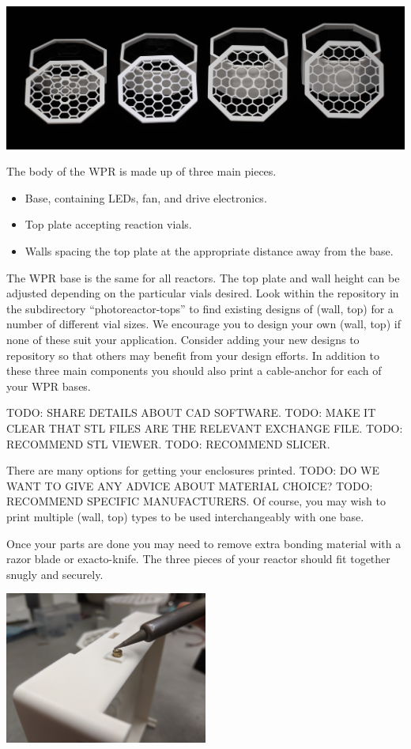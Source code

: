 \documentclass[11pt]{article}
\begin{document}
\includegraphics[width=\textwidth]{"./3dp-coverat.jpg"}

The body of the WPR is made up of three main pieces.

\begin{itemize}
    \item Base, containing LEDs, fan, and drive electronics.
    \item Top plate accepting reaction vials.
    \item Walls spacing the top plate at the appropriate distance away from the base.
\end{itemize}

The WPR base is the same for all reactors.
The top plate and wall height can be adjusted depending on the particular vials desired.
Look within the repository in the subdirectory ``photoreactor-tops'' to find existing designs of (wall, top) for a number of different vial sizes.
We encourage you to design your own (wall, top) if none of these suit your application.
Consider adding your new designs to repository so that others may benefit from your design efforts.
In addition to these three main components you should also print a cable-anchor for each of your WPR bases.

TODO: SHARE DETAILS ABOUT CAD SOFTWARE.
TODO: MAKE IT CLEAR THAT STL FILES ARE THE RELEVANT EXCHANGE FILE.
TODO: RECOMMEND STL VIEWER.
TODO: RECOMMEND SLICER.

There are many options for getting your enclosures printed.
TODO: DO WE WANT TO GIVE ANY ADVICE ABOUT MATERIAL CHOICE?
TODO: RECOMMEND SPECIFIC MANUFACTURERS.
Of course, you may wish to print multiple (wall, top) types to be used interchangeably with one base.

Once your parts are done you may need to remove extra bonding material with a razor blade or exacto-knife.
The three pieces of your reactor should fit together snugly and securely.

\includegraphics[width=0.5\textwidth]{"./heat-insert.jpg"}
\end{document}
